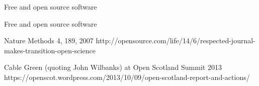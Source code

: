 \documentclass[xcolor={dvipsnames,usenames},beamer]{beamer}
\begin{document}
\begin{frame}{Free and open source software}



\end{frame}


\begin{frame}{Free and open source software}

  {Nature Methods 4, 189, 2007}%
  {http://opensource.com/life/14/6/respected-journal-makes-transition-open-science}

%
  {Cable Green (quoting John Wilbanks) at Open Scotland Summit 2013}
  {https://openscot.wordpress.com/2013/10/09/open-scotland-report-and-actions/}


\end{frame}
\end{document}
